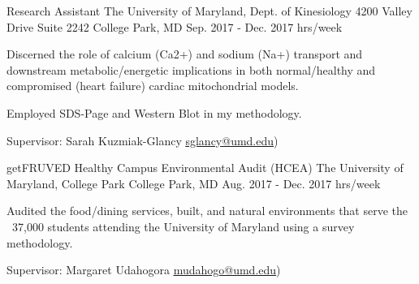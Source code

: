 \begin{cventries}


  \cventry
    {Research Assistant} %
    {The University of Maryland, Dept. of Kinesiology} %
    {4200 Valley Drive \newline Suite 2242 \newline College Park, MD} %
    {Sep. 2017 - Dec. 2017  hrs/week} %
    {
      \begin{cvitems} %
        \item {Discerned the role of calcium (Ca2+) and sodium (Na+) transport and downstream metabolic/energetic implications in both normal/healthy and compromised (heart failure) cardiac mitochondrial models.}
        \item{Employed SDS-Page and Western Blot in my methodology.}
        \item{Supervisor: Sarah Kuzmiak-Glancy
        {\underline{\href{mailto:sglancy@umd.edu}{sglancy@umd.edu}}})}
      \end{cvitems}
    }


  \cventry
    {getFRUVED Healthy Campus Environmental Audit (HCEA) } %
    {The University of Maryland, College Park} %
    {College Park, MD} %
    {Aug. 2017 - Dec. 2017  hrs/week} %
    {
      \begin{cvitems} %
        \item {Audited the food/dining services, built, and natural environments that serve the ~37,000 students attending the University of Maryland using a survey methodology.}
        \item{Supervisor: Margaret Udahogora
        {\underline{\href{mailto:mudahogo@umd.edu}{mudahogo@umd.edu}}})}
      \end{cvitems}
    }


\end{cventries}
